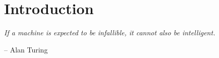 \chapter*{Introduction}
\epigraph{\itshape  If a machine is expected to be infallible, it cannot also be intelligent.}{-- Alan Turing}


\lipsum[10]




 